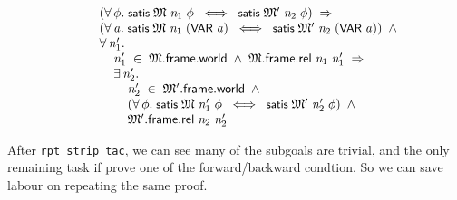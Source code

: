 \documentclass{report}
\renewcommand{\HOLConst}[1]{{\textsf{\upshape\small #1}}}
\newenvironment{holmath}{\begin{displaymath}\begin{array}{l}}{\end{array}\end{displaymath}\ignorespacesafterend}
\begin{document}
\begin{holmath}
\;\;\;\;\;\;\;\;(\HOLSymConst{\HOLTokenForall{}}\HOLBoundVar{\ensuremath{\phi}}.\;\HOLConst{satis}\;\HOLBoundVar{\ensuremath{\mathfrak{M}}}\;\HOLBoundVar{n\sb{\mathrm{1}}}\;\HOLBoundVar{\ensuremath{\phi}}\;\HOLSymConst{\HOLTokenEquiv{}}\;\HOLConst{satis}\;\HOLBoundVar{\ensuremath{\mathfrak{M}'}}\;\HOLBoundVar{n\sb{\mathrm{2}}}\;\HOLBoundVar{\ensuremath{\phi}})\;\HOLSymConst{\HOLTokenImp{}}\\
\;\;\;\;\;\;\;\;(\HOLSymConst{\HOLTokenForall{}}\HOLBoundVar{a}.\;\HOLConst{satis}\;\HOLBoundVar{\ensuremath{\mathfrak{M}}}\;\HOLBoundVar{n\sb{\mathrm{1}}}\;(\HOLConst{VAR}\;\HOLBoundVar{a})\;\HOLSymConst{\HOLTokenEquiv{}}\;\HOLConst{satis}\;\HOLBoundVar{\ensuremath{\mathfrak{M}'}}\;\HOLBoundVar{n\sb{\mathrm{2}}}\;(\HOLConst{VAR}\;\HOLBoundVar{a}))\;\HOLSymConst{\HOLTokenConj{}}\\
\;\;\;\;\;\;\;\;\HOLSymConst{\HOLTokenForall{}}\HOLBoundVar{n\sb{\mathrm{1}}\sp{\prime}}.\\
\;\;\;\;\;\;\;\;\;\;\;\;\HOLBoundVar{n\sb{\mathrm{1}}\sp{\prime}}\;\HOLSymConst{\HOLTokenIn{}}\;\HOLBoundVar{\ensuremath{\mathfrak{M}}}.\HOLFieldName{frame}.\HOLFieldName{world}\;\HOLSymConst{\HOLTokenConj{}}\;\HOLBoundVar{\ensuremath{\mathfrak{M}}}.\HOLFieldName{frame}.\HOLFieldName{rel}\;\HOLBoundVar{n\sb{\mathrm{1}}}\;\HOLBoundVar{n\sb{\mathrm{1}}\sp{\prime}}\;\HOLSymConst{\HOLTokenImp{}}\\
\;\;\;\;\;\;\;\;\;\;\;\;\HOLSymConst{\HOLTokenExists{}}\HOLBoundVar{n\sb{\mathrm{2}}\sp{\prime}}.\\
\;\;\;\;\;\;\;\;\;\;\;\;\;\;\;\;\HOLBoundVar{n\sb{\mathrm{2}}\sp{\prime}}\;\HOLSymConst{\HOLTokenIn{}}\;\HOLBoundVar{\ensuremath{\mathfrak{M}'}}.\HOLFieldName{frame}.\HOLFieldName{world}\;\HOLSymConst{\HOLTokenConj{}}\\
\;\;\;\;\;\;\;\;\;\;\;\;\;\;\;\;(\HOLSymConst{\HOLTokenForall{}}\HOLBoundVar{\ensuremath{\phi}}.\;\HOLConst{satis}\;\HOLBoundVar{\ensuremath{\mathfrak{M}}}\;\HOLBoundVar{n\sb{\mathrm{1}}\sp{\prime}}\;\HOLBoundVar{\ensuremath{\phi}}\;\HOLSymConst{\HOLTokenEquiv{}}\;\HOLConst{satis}\;\HOLBoundVar{\ensuremath{\mathfrak{M}'}}\;\HOLBoundVar{n\sb{\mathrm{2}}\sp{\prime}}\;\HOLBoundVar{\ensuremath{\phi}})\;\HOLSymConst{\HOLTokenConj{}}\\
\;\;\;\;\;\;\;\;\;\;\;\;\;\;\;\;\HOLBoundVar{\ensuremath{\mathfrak{M}'}}.\HOLFieldName{frame}.\HOLFieldName{rel}\;\HOLBoundVar{n\sb{\mathrm{2}}}\;\HOLBoundVar{n\sb{\mathrm{2}}\sp{\prime}}
\end{holmath}

After \texttt{rpt strip_tac}, we can see many of the subgoals are trivial, and the only remaining task if prove one of the forward/backward condtion. So we can save labour on repeating the same proof.
\end{document}
